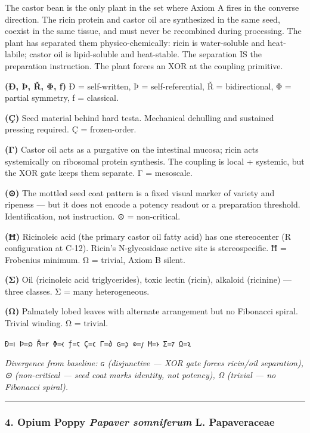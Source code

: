 \documentclass[12pt,a4paper]{article}
\begin{document}
The castor bean is the only plant in the set where Axiom A fires in the
converse direction. The ricin protein and castor oil are synthesized in
the same seed, coexist in the same tissue, and must never be recombined
during processing. The plant has separated them physico-chemically:
ricin is water-soluble and heat-labile; castor oil is lipid-soluble and
heat-stable. The separation IS the preparation instruction. The plant
forces an XOR at the coupling primitive.

\textbf{(Ð, Þ, Ř, Φ, ƒ)} Ð = self-written, Þ = self-referential, Ř =
bidirectional, Φ = partial symmetry, ƒ = classical.

\textbf{(Ç)} Seed material behind hard testa. Mechanical dehulling and
sustained pressing required. Ç = frozen-order.

\textbf{(Γ)} Castor oil acts as a purgative on the intestinal mucosa;
ricin acts systemically on ribosomal protein synthesis. The coupling is
local + systemic, but the XOR gate keeps them separate. Γ = mesoscale.

\textbf{(⊙)} The mottled seed coat pattern is a fixed visual marker of
variety and ripeness --- but it does not encode a potency readout or a
preparation threshold. Identification, not instruction. ⊙ =
non-critical.

\textbf{(Ħ)} Ricinoleic acid (the primary castor oil fatty acid) has one
stereocenter (R configuration at C-12). Ricin's N-glycosidase active
site is stereospecific. Ħ = Frobenius minimum. Ω = trivial, Axiom B
silent.

\textbf{(Σ)} Oil (ricinoleic acid triglycerides), toxic lectin (ricin),
alkaloid (ricinine) --- three classes. Σ = many heterogeneous.

\textbf{(Ω)} Palmately lobed leaves with alternate arrangement but no
Fibonacci spiral. Trivial winding. Ω = trivial.

\texttt{Ð=𐑦\ Þ=𐑸\ Ř=𐑾\ Φ=𐑬\ ƒ=𐑱\ Ç=𐑤\ Γ=𐑔\ ɢ=𐑜\ ⊙=𐑢\ Ħ=𐑶\ Σ=𐑳\ Ω=𐑷}

\emph{Divergence from baseline: ɢ (disjunctive --- XOR gate forces
ricin/oil separation), ⊙ (non-critical --- seed coat marks identity, not
potency), Ω (trivial --- no Fibonacci spiral).}

\begin{center}\rule{0.5\linewidth}{0.5pt}\end{center}

\hypertarget{opium-poppy-papaver-somniferum-l.-papaveraceae}{%
\subsubsection{\texorpdfstring{4. Opium Poppy \textbar{} \emph{Papaver
somniferum} L. \textbar{}
Papaveraceae}{4. Opium Poppy \textbar{} Papaver somniferum L. \textbar{} Papaveraceae}}\label{opium-poppy-papaver-somniferum-l.-papaveraceae}}
\end{document}
